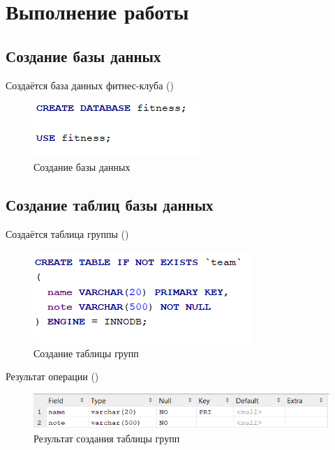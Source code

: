 \documentclass[a4paper,14pt]{article}
\begin{document}
\section{Выполнение работы}

\subsection{Создание базы данных}

	Создаётся база данных фитнес-клуба ()
	
	\begin{figure}[H]
		\centering		
		\includegraphics[width=0.4\linewidth]{image/createDB.png}
		\caption{Создание базы данных}\label{img:createDB}
	\end{figure}

\subsection{Создание таблиц базы данных}

	Создаётся таблица группы ()
	
	\begin{figure}[H]
		\centering		
		\includegraphics[width=0.5\linewidth]{image/createTeam.png}
		\caption{Создание таблицы групп}\label{img:createTeam}
	\end{figure}
	
	Результат операции ()
	
	\begin{figure}[H]
		\centering		
		\includegraphics[width=\linewidth]{image/resTeam}
		\caption{Результат создания таблицы групп}\label{img:resTeam}
	\end{figure} 
\end{document}
